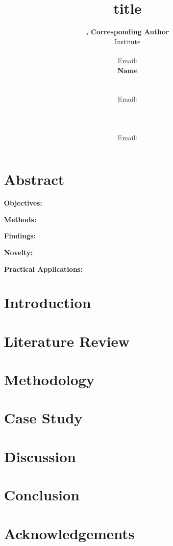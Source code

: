 \documentclass[numbered]{trbunofficial}
\title{title}
\author{%
  \textbf{, Corresponding Author}\\
  Institute\\
  \\
  Email:\\
  \hfill\break%
  \textbf{Name}\\
    \\
  \\
    Email: \\
  \hfill\break%
  \textbf{}\\
    \\
  \\
   Email: 
}
\begin{document}
\maketitle

\section{Abstract}
\hfill\break
\noindent\textbf{Objectives:} 
\hfill\break

\noindent\textbf{Methods:} 
\hfill\break

\noindent\textbf{Findings:} 
\hfill\break

\noindent\textbf{Novelty:} 
\hfill\break

\noindent\textbf{Practical Applications:} 

\newpage

\section{Introduction}







\section{Literature Review}





\section{Methodology}



\section{Case Study}


\section{Discussion}



\section{Conclusion}


\section{Acknowledgements}
\end{document}
